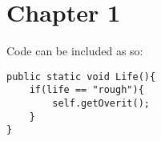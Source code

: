\chapter{Chapter 1 }

Code can be included as so:

\begin{lstlisting}
public static void Life(){
	if(life == "rough"){
		self.getOverit();
	}
}
\end{lstlisting}